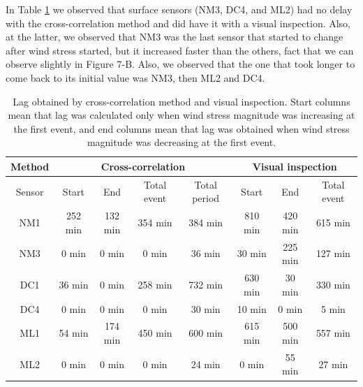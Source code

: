 \documentclass[tesis.tex]{subfiles}
\begin{document}
In Table \ref{tab:lag} we observed that surface sensors (NM3, DC4, and ML2) had no delay with the cross-correlation method and did have it with a visual inspection. Also, at the latter, we observed that NM3 was the last sensor that started to change after wind stress started, but it increased faster than the others, fact that we can observe slightly in Figure 7-B. Also, we observed that the one that took longer to come back to its initial value was NM3, then ML2 and DC4.

\begin{table}[]
    \centering
    \caption{Lag obtained by cross-correlation method and visual inspection. Start columns mean that lag was calculated only when wind stress magnitude was increasing at the first event, and end columns mean that lag was obtained when wind stress magnitude was decreasing at the first event.}
    \begin{tabular}{|c|cccc|ccc|}
    \hline
    Method &
      \multicolumn{4}{c|}{Cross-correlation} &
      \multicolumn{3}{c|}{Visual inspection} \\ \hline
    Sensor &
      \multicolumn{1}{c|}{Start} &
      \multicolumn{1}{c|}{End} &
      \multicolumn{1}{c|}{Total event} &
      Total period &
      \multicolumn{1}{c|}{Start} &
      \multicolumn{1}{c|}{End} &
      Total event \\ \hline
    NM1 &
      \multicolumn{1}{c|}{252 min} &
      \multicolumn{1}{c|}{132 min} &
      \multicolumn{1}{c|}{354 min} &
      384 min &
      \multicolumn{1}{c|}{810 min} &
      \multicolumn{1}{c|}{420 min} &
      615 min \\ \hline
    NM3 &
      \multicolumn{1}{c|}{0 min} &
      \multicolumn{1}{c|}{0 min} &
      \multicolumn{1}{c|}{0 min} &
      36 min &
      \multicolumn{1}{c|}{30 min} &
      \multicolumn{1}{c|}{225 min} &
      127 min \\ \hline
    DC1 &
      \multicolumn{1}{c|}{36 min} &
      \multicolumn{1}{c|}{0 min} &
      \multicolumn{1}{c|}{258 min} &
      732 min &
      \multicolumn{1}{c|}{630 min} &
      \multicolumn{1}{c|}{30 min} &
      330 min \\ \hline
    DC4 &
      \multicolumn{1}{c|}{0 min} &
      \multicolumn{1}{c|}{0 min} &
      \multicolumn{1}{c|}{0 min} &
      30 min &
      \multicolumn{1}{c|}{10 min} &
      \multicolumn{1}{c|}{0 min} &
      5 min \\ \hline
    ML1 &
      \multicolumn{1}{c|}{54 min} &
      \multicolumn{1}{c|}{174 min} &
      \multicolumn{1}{c|}{450 min} &
      600 min &
      \multicolumn{1}{c|}{615 min} &
      \multicolumn{1}{c|}{500 min} &
      557 min \\ \hline
    ML2 &
      \multicolumn{1}{c|}{0 min} &
      \multicolumn{1}{c|}{0 min} &
      \multicolumn{1}{c|}{0 min} &
      24 min &
      \multicolumn{1}{c|}{0 min} &
      \multicolumn{1}{c|}{55 min} &
      27 min \\ \hline
    \end{tabular}
    \label{tab:lag}
    \end{table}
\end{document}
